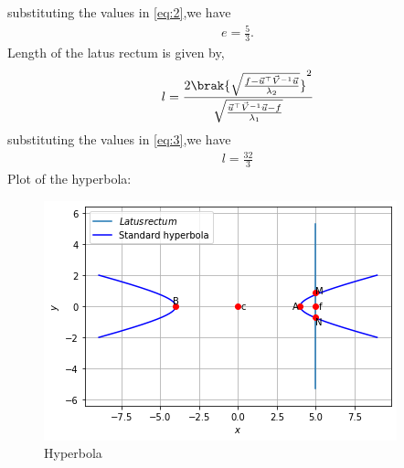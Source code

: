 \documentclass[journal,12pt,twocolumn]{IEEEtran}
\begin{document}
substituting the values in \eqref{eq:2},we have
\begin{align}
   e = \frac{5}{3}.
\end{align}
Length of the latus rectum is given by,
\begin{align}
    l = \frac{2\brak{{\sqrt{\frac{f-\vec{u}^{\top}\vec{V}^{-1}\vec{u}}{\lambda_2}}}}^2}{\sqrt{\frac{\vec{u}^{\top}\vec{V}^{-1}\vec{u}-f}{\lambda_1}}} \label{eq:3}
\end{align}
substituting the values in \eqref{eq:3},we have
\begin{align}
   l = \frac{32}{3}
\end{align}
Plot of the hyperbola:
\begin{figure}[H]
    \centering
    \includegraphics[width=\columnwidth]{hyperbola.png}
    \caption{Hyperbola}
    \label{fig:hyperbola}
\end{figure}  
\end{document}

